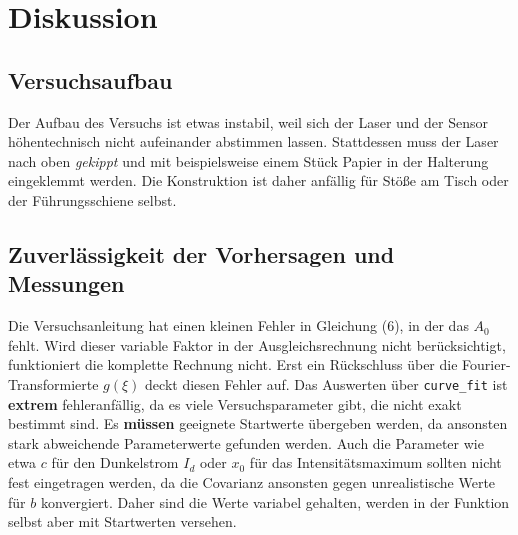 \section{Diskussion}
\label{sec:Diskussion}

\subsection{Versuchsaufbau}
Der Aufbau des Versuchs ist etwas instabil, weil sich der Laser und der Sensor höhentechnisch nicht aufeinander abstimmen lassen.
Stattdessen muss der Laser nach oben \textit{gekippt} und mit beispielsweise einem Stück Papier in der Halterung eingeklemmt werden.
Die Konstruktion ist daher anfällig für Stöße am Tisch oder der Führungsschiene selbst.

\subsection{Zuverlässigkeit der Vorhersagen und Messungen}
Die Versuchsanleitung hat einen kleinen Fehler in Gleichung (6), in der das $A_0$ fehlt. Wird dieser variable Faktor in der Ausgleichsrechnung nicht berücksichtigt,
funktioniert die komplette Rechnung nicht.
Erst ein Rückschluss über die Fourier-Transformierte $g(\xi)$ deckt diesen Fehler auf.
Das Auswerten über \texttt{curve\_fit} ist \textbf{extrem} fehleranfällig, da es viele Versuchsparameter gibt, die nicht exakt bestimmt sind.
Es \textbf{müssen} geeignete Startwerte übergeben werden, da ansonsten stark abweichende Parameterwerte gefunden werden.
Auch die Parameter wie etwa $c$ für den Dunkelstrom $I_d$ oder $x_0$ für das Intensitätsmaximum sollten nicht fest eingetragen werden, da die Covarianz ansonsten gegen
unrealistische Werte für $b$ konvergiert. Daher sind die Werte variabel gehalten, werden in der Funktion selbst aber mit Startwerten versehen. \\

